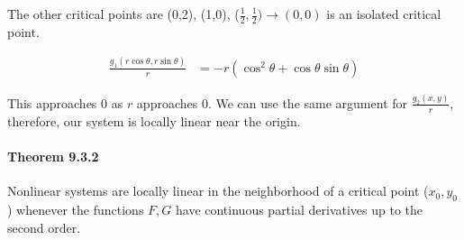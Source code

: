 \documentclass[letterpaper,12pt]{article}
\begin{document}
The other critical points are (0,2), (1,0), ($\frac{1}{2}, \frac{1}{2}) \to (0,0)$ is an
isolated critical point.


\begin{align*}
    \frac{g_1(r\cos\theta, r\sin\theta)}{r} &= -r(\cos^2\theta + \cos\theta\sin\theta)
\end{align*}


This approaches 0 as $r$ approaches 0. We can use the same argument for $\frac{g_2(x,y)}{r}$,
therefore, our system is locally linear near the origin.

\paragraph{Theorem 9.3.2}Nonlinear systems are locally linear in the neighborhood of a critical point
($x_0, y_0$) whenever the functions $F, G$ have continuous partial derivatives up to the second order.
\end{document}

